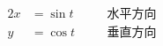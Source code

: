 \documentclass[nofonts]{ctexart}
\begin{document}
\begin{alignat}{2}
	x &= \sin t	&\quad& \text{水平方向}	\\
	y &= \cos t	&\quad& \text{垂直方向}
\end{alignat}
\end{document}
